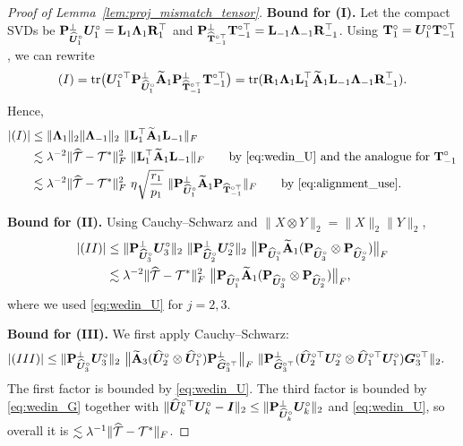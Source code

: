 \documentclass[authoryear,preprint,review,12pt]{elsarticle}
\begin{document}
{\begin{proof}[Proof of Lemma~\ref{lem:proj_mismatch_tensor}]
		\smallskip
		\noindent\textbf{Bound for (I).}
		Let the compact SVDs be
		$\mathbf{P}_{\widehat{\boldsymbol U}_1^\circ}^{\perp}\boldsymbol U_1^\circ=\mathbf{L}_1\boldsymbol \Lambda_1\mathbf{R}_1^\top$ and
		$\mathbf{P}_{\widehat{\mathbf{T}}_{-1}^{\circ\top}}^{\perp}\mathbf{T}_{-1}^{\circ\top}=\mathbf{L}_{-1}\boldsymbol \Lambda_{-1}\mathbf{R}_{-1}^\top$.
		Using $\mathbf{T}_1^\circ=\boldsymbol U_1^\circ\mathbf{T}_{-1}^{\circ\top}$, we can rewrite
		\[
		(I)=\mathrm{tr}\big(\boldsymbol U_1^{\circ\top}\mathbf{P}_{\widehat{\boldsymbol U}_1^\circ}^{\perp}\widetilde{\mathbf{A}}_1\mathbf{P}_{\widehat{\mathbf{T}}_{-1}^{\circ\top}}^{\perp}\mathbf{T}_{-1}^{\circ\top} \big)
		=
		\mathrm{tr}(\mathbf{R}_1\boldsymbol \Lambda_1\mathbf{L}_1^\top\widetilde{\mathbf{A}}_1\mathbf{L}_{-1}\boldsymbol \Lambda_{-1}\mathbf{R}_{-1}^\top).
		\]
		Hence,
		\begin{align}
			|(I)|
			&\le \|\bLambda_1\|_2\|\bLambda_{-1}\|_2\ \|\bL_1^\top\widetilde{\bA}_1\bL_{-1}\|_F
			\notag\\
			&\lesssim \lambda^{-2}\|\widehat{\mT}-\mT^\ast\|_F^2\ \|\bL_1^\top\widetilde{\bA}_1\bL_{-1}\|_F
			\qquad\text{by }\eqref{eq:wedin_U}\text{ and the analogue for }\bT_{-1}^\circ
			\notag\\
			&\lesssim \lambda^{-2}\|\widehat{\mT}-\mT^\ast\|_F^2\ \eta\sqrt{\frac{r_1}{p_1}}\ \|\bP_{\widehat{\bU}_1^\circ}^{\perp}\widetilde{\bA}_1\bP_{\widehat{\bT}_{-1}^{\circ\top}}\|_F
			\qquad\text{by }\eqref{eq:alignment_use}.
			\label{eq:I_bound}
		\end{align}
		
		\smallskip
		\noindent\textbf{Bound for (II).}
		Using Cauchy--Schwarz and $\|X\otimes Y\|_2=\|X\|_2\|Y\|_2$,
		\begin{align}
			|(II)|
			&\le
			\|\bP_{\widehat{\bU}_3^\circ}^{\perp}\bU_3^\circ\|_2\ \|\bP_{\widehat{\bU}_2^\circ}^{\perp}\bU_2^\circ\|_2\
			\big\|\bP_{\widehat{\bU}_1^\circ}\widetilde{\bA}_1(\bP_{\widehat{\bU}_3^\circ}\otimes\bP_{\widehat{\bU}_2^\circ})\big\|_F
			\notag\\
			&\lesssim \lambda^{-2}\|\widehat{\mT}-\mT^\ast\|_F^2\
			\big\|\bP_{\widehat{\bU}_1^\circ}\widetilde{\bA}_1(\bP_{\widehat{\bU}_3^\circ}\otimes\bP_{\widehat{\bU}_2^\circ})\big\|_F,
			\label{eq:II_bound}
		\end{align}
		where we used \eqref{eq:wedin_U} for $j=2,3$.
		
		\smallskip
		\noindent\textbf{Bound for (III).}
		We first apply Cauchy--Schwarz:
		\begin{align}
			|(III)|
			&\le
			\|\mathbf{P}_{\widehat{\boldsymbol U}_3^\circ}^{\perp}\boldsymbol U_3^\circ\|_2\
			\big\|\widetilde{\mathbf{A}}_3(\widehat{\boldsymbol U}_2^\circ\otimes\widehat{\boldsymbol U}_1^\circ)\mathbf{P}_{\widehat{\boldsymbol G}_3^{\circ\top}}^{\perp}\big\|_F\
			\|\mathbf{P}_{\widehat{\boldsymbol G}_3^{\circ\top}}^{\perp}(\widehat{\boldsymbol U}_2^{\circ\top}\boldsymbol U_2^\circ\otimes \widehat{\boldsymbol U}_1^{\circ\top}\boldsymbol U_1^\circ)\boldsymbol G_3^{\circ\top}\|_2.
			\notag
		\end{align}
		The first factor is bounded by \eqref{eq:wedin_U}. The third factor is bounded by \eqref{eq:wedin_G} together with
		$\|\widehat{\boldsymbol U}_k^{\circ\top}\boldsymbol U_k^\circ-\boldsymbol I\|_2\le \|\mathbf{P}_{\widehat{\boldsymbol U}_k^\circ}^{\perp}\boldsymbol U_k^\circ\|_2$ and \eqref{eq:wedin_U},
		so overall it is $\lesssim \lambda^{-1}\|\widehat{\mathcal{T}}-\mathcal{T}^\ast\|_F$.
		

\end{proof}}
\end{document}
